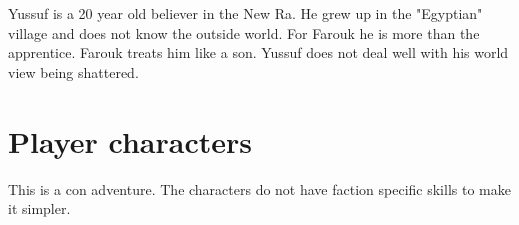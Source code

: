 \begin{npcBox}[title=Yussuf]
    \begin{consequences}
    \item {}
    \item {}
    \item {}
    \end{consequences}

    \begin{npcDescription}
    Yussuf is a 20 year old believer in the New Ra. He grew up in the "Egyptian" village and does not know the outside world. For Farouk he is more than the apprentice. Farouk treats him like a son. Yussuf does not deal well with his world view being shattered.
    \end{npcDescription}

\end{npcBox}

\newpage

\section{Player characters}

This is a con adventure. The characters do not have faction specific skills to make it simpler.
\newpage


